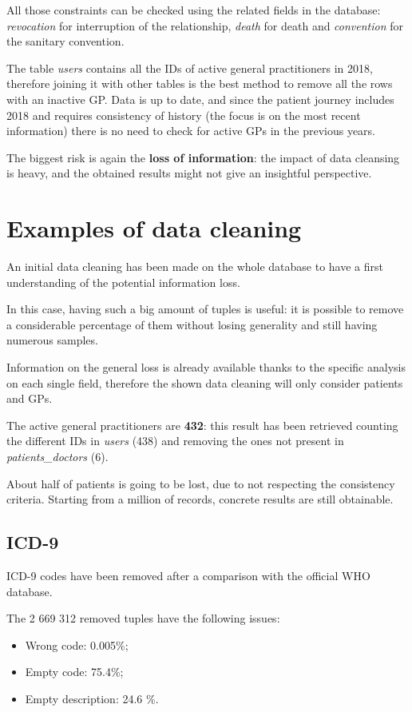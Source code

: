 All those constraints can be checked using the related fields in the database: \textit{revocation} for interruption of the relationship, \textit{death} for death and \textit{convention} for the sanitary convention.

The table \textit{users} contains all the IDs of active general practitioners in 2018, therefore joining it with other tables is the best method to remove all the rows with an inactive GP. Data is up to date, and since the patient journey includes 2018 and requires consistency of history (the focus is on the most recent information) there is no need to check for active GPs in the previous years.

The biggest risk is again the \textbf{loss of information}: the impact of data cleansing is heavy, and the obtained results might not give an insightful perspective.

\section{Examples of data cleaning}
An initial data cleaning has been made on the whole database to have a first understanding of the potential information loss.

In this case, having such a big amount of tuples is useful: it is possible to remove a considerable percentage of them without losing generality and still having numerous samples.

Information on the general loss is already available thanks to the specific analysis on each single field, therefore the shown data cleaning will only consider patients and GPs.

The active general practitioners are \textbf{432}: this result has been retrieved counting the different IDs in \textit{users} (438) and removing the ones not present in \textit{patients\_doctors} (6).

About half of patients is going to be lost, due to not respecting the consistency criteria. Starting from a million of records, concrete results are still obtainable.

\subsection{ICD-9}
ICD-9 codes have been removed after a comparison with the official WHO database.

The 2 669 312 removed tuples have the following issues:
\begin{itemize}
	\item Wrong code: 0.005\%;
	\item Empty code: 75.4\%;
	\item Empty description: 24.6 \%.
\end{itemize}

